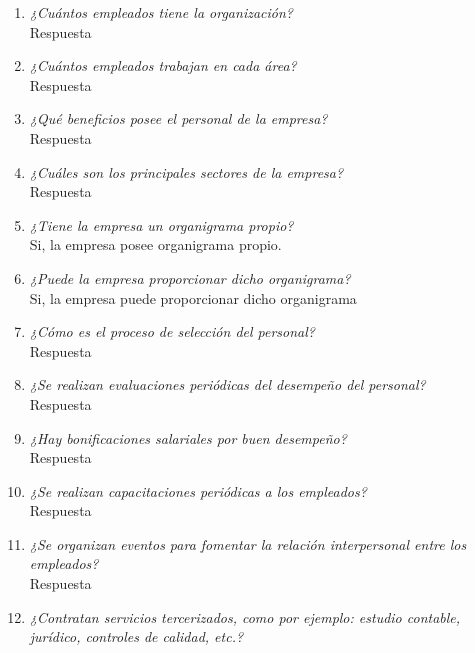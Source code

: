 \documentclass[a4paper,10pt]{article}
\begin{document}
		
			\begin{enumerate}[resume]

			\item \textit{¿Cuántos empleados tiene la organización?}\\
			
			Respuesta
				
			\item \textit{¿Cuántos empleados trabajan en cada área?}\\
			
			Respuesta
				
			\item \textit{¿Qué beneficios posee el personal de la empresa?}\\
			
			Respuesta
			
			\item \textit{¿Cuáles son los principales sectores de la empresa?}\\
			
			Respuesta
			
			\item \textit{¿Tiene la empresa un organigrama propio?}\\
			Si, la empresa posee organigrama propio.
					
			\item \textit{¿Puede la empresa proporcionar dicho organigrama?}\\
			Si, la empresa puede proporcionar dicho organigrama
			
			\item \textit{¿Cómo es el proceso de selección del personal? }\\
			
			Respuesta
			
			\item \textit{¿Se realizan evaluaciones periódicas del desempeño del personal?}\\
			
			Respuesta
			
			\item \textit{¿Hay bonificaciones salariales por buen desempeño?}\\
			
			Respuesta
			
			\item \textit{¿Se realizan capacitaciones periódicas a los empleados?}\\
			
			Respuesta
			
			\item \textit{¿Se organizan eventos para fomentar la relación interpersonal entre los empleados?}\\
			
			Respuesta
			
			\item \textit{¿Contratan servicios tercerizados, como por ejemplo: estudio contable, jurídico, controles de calidad, etc.?}\\

			\end{enumerate}
			
\end{document}
